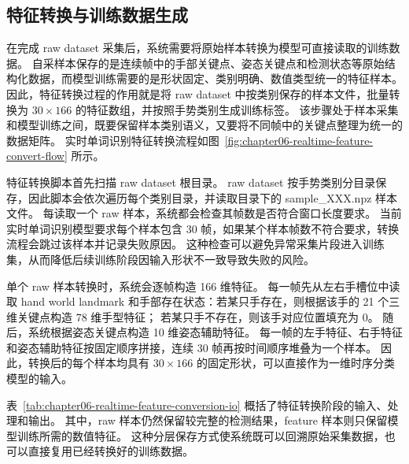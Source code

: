 
\subsection{特征转换与训练数据生成}

在完成 raw dataset 采集后，系统需要将原始样本转换为模型可直接读取的训练数据。
自采样本保存的是连续帧中的手部关键点、姿态关键点和检测状态等原始结构化数据，而模型训练需要的是形状固定、类别明确、数值类型统一的特征样本。
因此，特征转换过程的作用就是将 raw dataset 中按类别保存的样本文件，批量转换为 $30\times166$ 的特征数组，并按照手势类别生成训练标签。
该步骤处于样本采集和模型训练之间，既要保留样本类别语义，又要将不同帧中的关键点整理为统一的数据矩阵。
实时单词识别特征转换流程如图~\ref{fig:chapter06-realtime-feature-convert-flow} 所示。

特征转换脚本首先扫描 raw dataset 根目录。
raw dataset 按手势类别分目录保存，因此脚本会依次遍历每个类别目录，并读取目录下的 sample\_XXX.npz 样本文件。
每读取一个 raw 样本，系统都会检查其帧数是否符合窗口长度要求。
当前实时单词识别模型要求每个样本包含 30 帧，如果某个样本帧数不符合要求，转换流程会跳过该样本并记录失败原因。
这种检查可以避免异常采集片段进入训练集，从而降低后续训练阶段因输入形状不一致导致失败的风险。

单个 raw 样本转换时，系统会逐帧构造 166 维特征。
每一帧先从左右手槽位中读取 hand world landmark 和手部存在状态：若某只手存在，则根据该手的 21 个三维关键点构造 78 维手型特征；
若某只手不存在，则该手对应位置填充为 0。
随后，系统根据姿态关键点构造 10 维姿态辅助特征。
每一帧的左手特征、右手特征和姿态辅助特征按固定顺序拼接，连续 30 帧再按时间顺序堆叠为一个样本。
因此，转换后的每个样本均具有 $30\times166$ 的固定形状，可以直接作为一维时序分类模型的输入。


表~\ref{tab:chapter06-realtime-feature-conversion-io} 概括了特征转换阶段的输入、处理和输出。
其中，raw 样本仍然保留较完整的检测结果，feature 样本则只保留模型训练所需的数值特征。
这种分层保存方式使系统既可以回溯原始采集数据，也可以直接复用已经转换好的训练数据。

